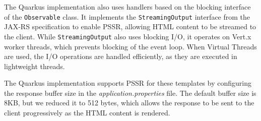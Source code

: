 The Quarkus implementation also uses handlers based on the blocking interface
of the \texttt{Observable} class. It implements the \texttt{StreamingOutput} interface
from the JAX-RS specification to enable PSSR, allowing HTML content to be
streamed to the client. While \texttt{StreamingOutput} also uses blocking I/O, it
operates on Vert.x worker threads, which prevents blocking of the event loop.
When Virtual Threads are used, the I/O operations are handled efficiently, as
they are executed in lightweight threads.

The Quarkus implementation supports PSSR for these templates by configuring the
response buffer size in the \textit{application.properties} file. The default
buffer size is 8KB, but we reduced it to 512 bytes, which allows the response
to be sent to the client progressively as the HTML content is rendered.

